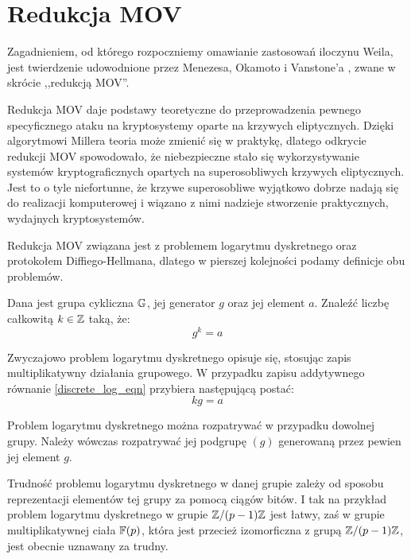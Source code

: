 \section{Redukcja MOV}

\noindent
Zagadnieniem, od którego rozpoczniemy omawianie zastosowań iloczynu Weila,
jest twierdzenie
udowodnione przez Menezesa, Okamoto i Vanstone'a \cite{menezesokamotovanstone},
zwane w skrócie ,,redukcją MOV''.

\noindent
Redukcja MOV daje podstawy teoretyczne
do przeprowadzenia pewnego specyficznego ataku
na kryptosystemy oparte na krzywych eliptycznych.
Dzięki algorytmowi Millera teoria może zmienić się w praktykę,
dlatego odkrycie redukcji MOV spowodowało,
że niebezpieczne stało się wykorzystywanie systemów kryptograficznych
opartych na superosobliwych krzywych eliptycznych.
Jest to o tyle niefortunne,
że krzywe superosobliwe wyjątkowo dobrze nadają się do
realizacji komputerowej
i wiązano z nimi nadzieje stworzenie praktycznych, wydajnych kryptosystemów.

\noindent
Redukcja MOV związana jest
z problemem logarytmu dyskretnego oraz protokołem Diff\-iego-Hell\-mana,
dlatego w pierszej kolejności podamy definicje obu problemów.

\begin{problem}
Dana jest grupa cykliczna $\mathbb{G}$,
jej generator $g$
oraz jej element $a$.
Znaleźć liczbę całkowitą $k \in \mathbb{Z}$ taką, że:
\begin{equation}\label{discrete_log_eqn}
g^k = a
\end{equation}
\end{problem}

\begin{remark}
Zwyczajowo problem logarytmu dyskretnego opisuje się,
stosując zapis multiplikatywny działania grupowego.
W przypadku zapisu addytywnego równanie \ref{discrete_log_eqn}
przybiera następującą postać:
\begin{equation}\label{discrete_log_additive_eqn}
kg = a
\end{equation}
\end{remark}

\begin{remark}
Problem logarytmu dyskretnego można rozpatrywać w przypadku dowolnej grupy.
Należy wówczas rozpatrywać jej podgrupę $(g)$
generowaną przez pewien jej element $g$.
\end{remark}

\begin{remark}
Trudność problemu logarytmu dyskretnego w danej grupie
zależy od sposobu reprezentacji elementów tej grupy
za pomocą ciągów bitów.
I tak na przykład problem logarytmu dyskretnego w grupie $\mathbb{Z} / (p-1)\mathbb{Z}$
jest łatwy,
zaś w grupie multiplikatywnej ciała $\mathbb{F}(p)$,
która jest przecież izomorficzna z grupą $\mathbb{Z} / (p-1)\mathbb{Z}$,
jest obecnie uznawany za trudny.
\end{remark}

